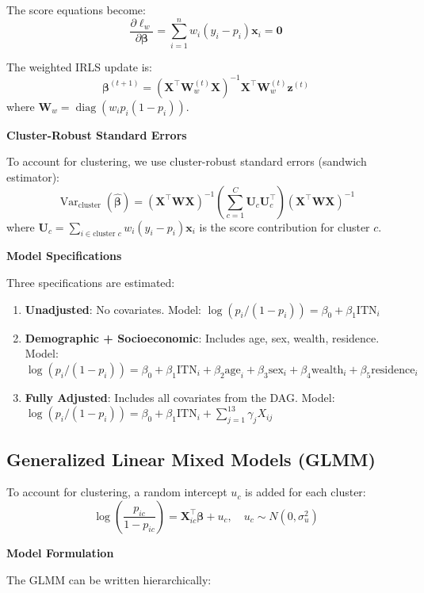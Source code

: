 The score equations become:
\[
\frac{\partial \ell_w}{\partial \boldsymbol{\beta}} = \sum_{i=1}^n w_i (y_i - p_i) \mathbf{x}_i = \mathbf{0}
\]

The weighted IRLS update is:
\[
\boldsymbol{\beta}^{(t+1)} = (\mathbf{X}^\top \mathbf{W}_w^{(t)} \mathbf{X})^{-1} \mathbf{X}^\top \mathbf{W}_w^{(t)} \mathbf{z}^{(t)}
\]
where $\mathbf{W}_w = \operatorname{diag}(w_i p_i(1-p_i))$.

\textbf{Cluster-Robust Standard Errors}

To account for clustering, we use cluster-robust standard errors (sandwich estimator):
\[
\operatorname{Var}_{\text{cluster}}(\hat{\boldsymbol{\beta}}) = (\mathbf{X}^\top \mathbf{W} \mathbf{X})^{-1} \left( \sum_{c=1}^C \mathbf{U}_c \mathbf{U}_c^\top \right) (\mathbf{X}^\top \mathbf{W} \mathbf{X})^{-1}
\]
where $\mathbf{U}_c = \sum_{i \in \text{cluster } c} w_i (y_i - p_i) \mathbf{x}_i$ is the score contribution for cluster $c$.

\textbf{Model Specifications}

Three specifications are estimated:

\begin{enumerate}
	\item \textbf{Unadjusted}: No covariates. Model: $\log(p_i/(1-p_i)) = \beta_0 + \beta_1 \text{ITN}_i$
	
	\item \textbf{Demographic + Socioeconomic}: Includes age, sex, wealth, residence. Model: $\log(p_i/(1-p_i)) = \beta_0 + \beta_1 \text{ITN}_i + \beta_2 \text{age}_i + \beta_3 \text{sex}_i + \beta_4 \text{wealth}_i + \beta_5 \text{residence}_i$
	
	\item \textbf{Fully Adjusted}: Includes all covariates from the DAG. Model: $\log(p_i/(1-p_i)) = \beta_0 + \beta_1 \text{ITN}_i + \sum_{j=1}^{13} \gamma_j X_{ij}$
\end{enumerate}

\subsection{Generalized Linear Mixed Models (GLMM)}

To account for clustering, a random intercept $u_c$ is added for each cluster:
\[
\log\left(\frac{p_{ic}}{1-p_{ic}}\right) = \mathbf{X}_{ic}^\top \boldsymbol{\beta} + u_c, \quad u_c \sim N(0, \sigma_u^2)
\]

\textbf{Model Formulation}

The GLMM can be written hierarchically:

